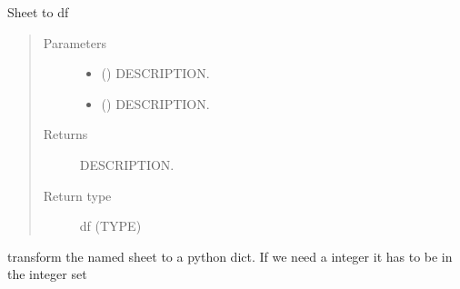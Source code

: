 \documentclass[letterpaper,10pt,english]{sphinxmanual}
\begin{document}
\begin{fulllineitems}
\label{\detokenize{onboard/model_Excel:model_Excel.sheet_to_df}}
\pysigstartsignatures
{}
\pysigstopsignatures
\sphinxAtStartPar
Sheet to df
\begin{quote}\begin{description}
\item[{Parameters}] \leavevmode\begin{itemize}
\item {} 
\sphinxAtStartPar
{} () \textendash{} DESCRIPTION.

\item {} 
\sphinxAtStartPar
{} () \textendash{} DESCRIPTION.

\end{itemize}

\item[{Returns}] \leavevmode
\sphinxAtStartPar
DESCRIPTION.

\item[{Return type}] \leavevmode
\sphinxAtStartPar
df (TYPE)

\end{description}\end{quote}

\end{fulllineitems}


\begin{fulllineitems}
\label{\detokenize{onboard/model_Excel:model_Excel.sheet_to_dict}}
\pysigstartsignatures
{}
\pysigstopsignatures
\sphinxAtStartPar
transform the named sheet to a python dict. If we need a integer it has to be in the integer set

\end{fulllineitems}


\sphinxstepscope
\end{document}
